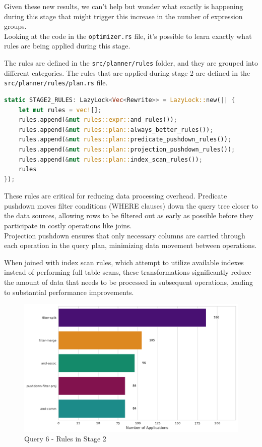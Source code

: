 \documentclass[a4paper,12pt]{scrreprt}
\begin{document}
Given these new results, we can't help but wonder what exactly is happening during this stage that might trigger this increase in the number of expression groups. \\ Looking at the code in the \texttt{optimizer.rs} file, it's possible to learn exactly what rules are being applied during this stage. 

The rules are defined in the \texttt{src/planner/rules} folder, and they are grouped into different categories. The rules that are applied during stage 2 are defined in the \texttt{src/planner/rules/plan.rs} file. 

\begin{lstlisting}[language=Rust]
static STAGE2_RULES: LazyLock<Vec<Rewrite>> = LazyLock::new(|| {
    let mut rules = vec![];
    rules.append(&mut rules::expr::and_rules());
    rules.append(&mut rules::plan::always_better_rules());
    rules.append(&mut rules::plan::predicate_pushdown_rules());
    rules.append(&mut rules::plan::projection_pushdown_rules());
    rules.append(&mut rules::plan::index_scan_rules());
    rules
});
\end{lstlisting}

These rules are critical for reducing data processing overhead. Predicate pushdown moves filter conditions (WHERE clauses) down the query tree closer to the data sources, allowing rows to be filtered out as early as possible before they participate in costly operations like joins. \\
Projection pushdown ensures that only necessary columns are carried through each operation in the query plan, minimizing data movement between operations.

When joined with index scan rules, which attempt to utilize available indexes instead of performing full table scans, these transformations significantly reduce the amount of data that needs to be processed in subsequent operations, leading to substantial performance improvements.

\begin{figure}[H]
    \centering
    \includegraphics[width=\linewidth]{img/img_rule_mostpop/top_5_rules_stage2_q6.png}
    \caption{Query 6 - Rules in Stage 2}
    \label{fig:rules1}
\end{figure}
\end{document}
